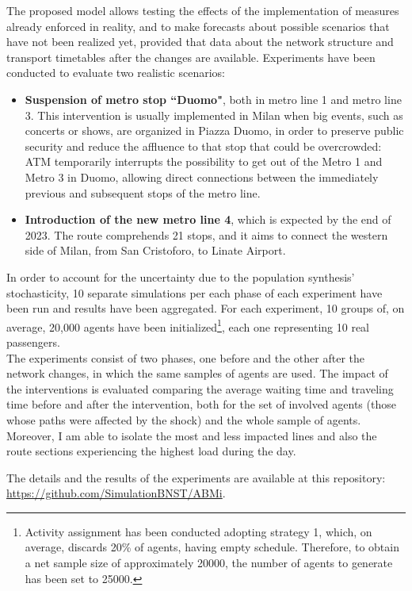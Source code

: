 The proposed model allows testing the effects of the implementation of measures already enforced in reality, and to make forecasts about possible scenarios that have not been realized yet, provided that data about the network structure and transport timetables after the changes are available.
Experiments have been conducted to evaluate two realistic scenarios:
\begin{itemize}
    \item \textbf{Suspension of metro stop ``Duomo"}, both in metro line 1 and metro line 3. This intervention is usually implemented in Milan when big events, such as concerts or shows, are organized in Piazza Duomo, in order to preserve public security and reduce the affluence to that stop that could be overcrowded: ATM temporarily interrupts the possibility to get out of the Metro 1 and Metro 3 in Duomo, allowing direct connections between the immediately previous and subsequent stops of the metro line.  
    \item \textbf{Introduction of the new metro line 4}, which is expected by the end of 2023. The route comprehends 21 stops, and it aims to connect the western side of Milan, from San Cristoforo, to Linate Airport.
\end{itemize}
In order to account for the uncertainty due to the population synthesis' stochasticity, 10 separate simulations per each phase of each experiment have been run and results have been aggregated. For each experiment, 10 groups of, on average, 20,000 agents have been initialized\footnote{Activity assignment has been conducted adopting strategy 1, which, on average, discards 20\% of agents, having empty schedule. Therefore, to obtain a net sample size of approximately 20000, the number of agents to generate has been set to 25000.}, each one representing 10 real passengers. \\
The experiments consist of two phases, one before and the other after the network changes, in which the same samples of agents are used. The impact of the interventions is evaluated comparing the average waiting time and traveling time before and after the intervention, both for the set of involved agents (those whose paths were affected by the shock) and the whole sample of agents. Moreover, I am able to isolate the most and less impacted lines and also the route sections experiencing the highest load during the day.

The details and the results of the experiments are available at this repository: \\ \url{https://github.com/SimulationBNST/ABMi}.
